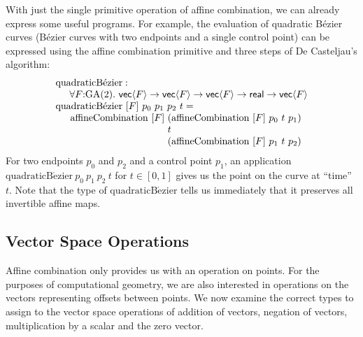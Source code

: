 \begin{example}
  With just the single primitive operation of affine combination, we
  can already express some useful programs. For example, the
  evaluation of quadratic B\'{e}zier curves (B\'{e}zier curves with
  two endpoints and a single control point) can be expressed using the
  affine combination primitive and three steps of De Casteljau's
  algorithm:
  \begin{displaymath}
    \begin{array}{l}
      \mathrm{quadraticB\acute{e}zier} :\\
      \hspace{0.5cm}\forall F \mathord:\GA(2).\ \mathsf{vec}\langle F \rangle \to \mathsf{vec}\langle F \rangle \to \mathsf{vec}\langle F \rangle \to \mathsf{real} \to \mathsf{vec}\langle F \rangle \\
      \mathrm{quadraticB\acute{e}zier}\ [F]\ p_0\ p_1\ p_2\ t = \\
      \quad
      \begin{array}{l@{\hspace{-0.002cm}}l}
        \mathrm{affineCombination}\ [F]\ & (\mathrm{affineCombination}\ [F]\ p_0\ t\ p_1) \\
        & t \\
        & (\mathrm{affineCombination}\ [F]\ p_1\ t\ p_2)
      \end{array}
    \end{array}
  \end{displaymath}
  For two endpoints $p_0$ and $p_2$ and a control point $p_1$, an
  application $\mathrm{quadraticB\acute{e}zier}\ p_0\ p_1\ p_2\ t$ for
  $t \in [0,1]$ gives us the point on the curve at ``time'' $t$. Note
  that the type of $\mathrm{quadraticB\acute{e}zier}$ tells us
  immediately that it preserves all invertible affine maps.
\end{example}

\subsection{Vector Space Operations}
\label{sec:vector-space-ops}

Affine combination only provides us with an operation on points. For
the purposes of computational geometry, we are also interested in
operations on the vectors representing offsets between points. We now
examine the correct types to assign to the vector space operations of
addition of vectors, negation of vectors, multiplication by a scalar
and the zero vector.


